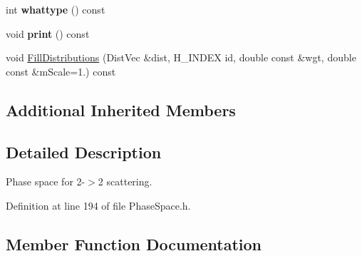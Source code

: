 \begin{DoxyCompactItemize}
\item 
\hypertarget{classPS__2__2_a27ba82e9c32ba391be7df643181de646}{}int {\bfseries whattype} () const \label{classPS__2__2_a27ba82e9c32ba391be7df643181de646}

\item 
\hypertarget{classPS__2__2_af19d44fe30fb72ccfc20f5626f04dcdc}{}void {\bfseries print} () const \label{classPS__2__2_af19d44fe30fb72ccfc20f5626f04dcdc}

\item 
void \hyperlink{classPS__2__2_a0a0123bc7015775e5aba3a862f5ac456}{Fill\+Distributions} (Dist\+Vec \&dist, H\+\_\+\+I\+N\+D\+E\+X id, double const \&wgt, double const \&m\+Scale=1.) const 
\end{DoxyCompactItemize}
\subsection*{Additional Inherited Members}


\subsection{Detailed Description}
Phase space for 2-\/$>$2 scattering. 

Definition at line 194 of file Phase\+Space.\+h.



\subsection{Member Function Documentation}
\hypertarget{classPS__2__2_a0a0123bc7015775e5aba3a862f5ac456}{}
